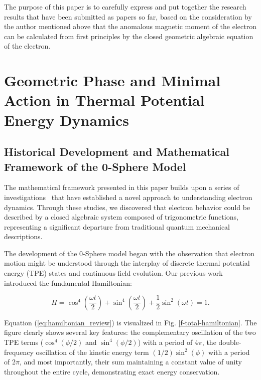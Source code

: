 \documentclass[%
 reprint,
 amsmath,amssymb,
 aps,
]{revtex4-1}
\numberwithin{equation}{section}%
\begin{document}
The purpose of this paper is to carefully express and put together the research results that have been submitted as papers so far, based on the consideration by the author mentioned above that the anomalous magnetic moment of the electron can be calculated from first principles by the closed geometric algebraic equation of the electron.


\section{\label{sec:Geometric Phase and}Geometric Phase and Minimal Action in Thermal Potential Energy Dynamics}
\subsection{\label{sec:Historical Development and}Historical Development and Mathematical Framework of the 0-Sphere Model}

The mathematical framework presented in this paper builds upon a series of investigations~\cite{hanamura2018, hanamura2020, hanamura2023} that have established a novel approach to understanding electron dynamics. Through these studies, we discovered that electron behavior could be described by a closed algebraic system composed of trigonometric functions, representing a significant departure from traditional quantum mechanical descriptions.

The development of the 0-Sphere model began with the observation that electron motion might be understood through the interplay of discrete thermal potential energy (TPE) states and continuous field evolution. Our previous work~\cite{hanamura2018} introduced the fundamental Hamiltonian:

\begin{equation}
    H = \cos^4\left(\frac{\omega t}{2}\right) + \sin^4\left(\frac{\omega t}{2}\right) + \frac{1}{2}\sin^2\left(\omega t\right) = 1.
    \label{eq:hamiltonian_review}
\end{equation}

Equation (\ref{eq:hamiltonian_review}) is visualized in Fig. \ref{f-total-hamiltonian}. The figure clearly shows several key features: the complementary oscillation of the two TPE terms ($\cos^4(\phi/2)$ and $\sin^4(\phi/2)$) with a period of 4$\pi$, the double-frequency oscillation of the kinetic energy term $(1/2)\sin^2(\phi)$ with a period of 2$\pi$, and most importantly, their sum maintaining a constant value of unity throughout the entire cycle, demonstrating exact energy conservation.
\end{document}
